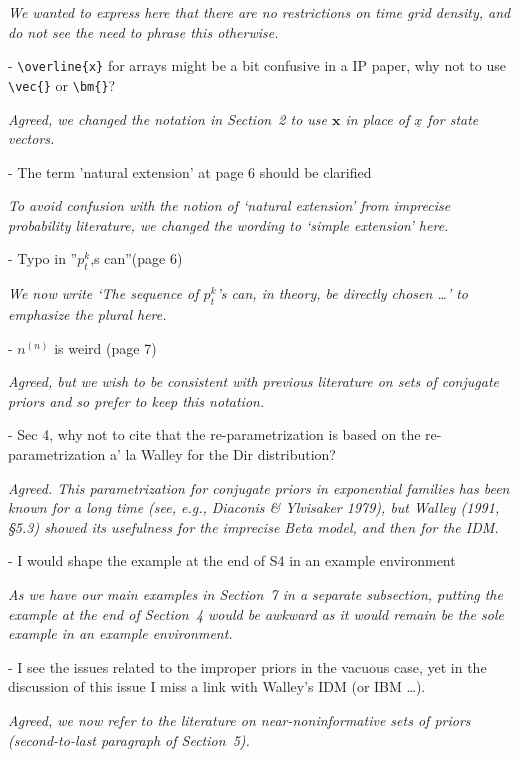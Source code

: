 \documentclass[12pt, a4paper]{elsarticle}
\newcommand{\bs}[1]{\boldsymbol{#1}}
\renewcommand{\vec}[1]{{\bs#1}}
\newcommand{\ptk}{p^k_t}
\begin{document}
\medskip
\emph{We wanted to express here that there are no restrictions on time grid density,
and do not see the need to phrase this otherwise.}
\medskip

- \verb+\overline{x}+ for arrays might be a bit confusive in a IP paper, why not to use \verb+\vec{}+ or \verb+\bm{}+?

\medskip
\emph{Agreed, we changed the notation in Section~2 to use $\vec{x}$ in place of $\underline{x}$ for state vectors.}
\medskip

- The term 'natural extension' at page 6 should be clarified

\medskip
\emph{To avoid confusion with the notion of `natural extension' from imprecise probability literature,
we changed the wording to `simple extension' here.}
\medskip

- Typo in ''$p_t^k$,s can''(page 6)

\medskip
\emph{We now write `The sequence of $\ptk$'s can, in theory, be directly chosen \ldots' to emphasize the plural here.}
\medskip

- $n^{(n)}$ is weird (page 7)

\medskip
\emph{Agreed, but we wish to be consistent with previous literature on sets of conjugate priors and so prefer to keep this notation.}
\medskip

- Sec 4, why not to cite that the re-parametrization is based on the re-parametrization a' la Walley for the Dir distribution?

\medskip
\emph{Agreed. This parametrization for conjugate priors in exponential families has been known for a long time
(see, e.g., Diaconis \& Ylvisaker 1979),
but Walley (1991, \S 5.3) showed its usefulness for the imprecise Beta model, and then for the IDM.
}
\medskip

- I would shape the example at the end of S4 in an example environment

\medskip
\emph{As we have our main examples in Section~7 in a separate subsection,
putting the example at the end of Section~4 would be awkward as
it would remain be the sole example in an example environment.}
\medskip

- I see the issues related to the improper priors in the vacuous case, yet in the discussion of this issue I miss a link with Walley's IDM (or IBM \ldots).

\medskip
\emph{Agreed, we now refer to the literature on near-noninformative sets of priors (second-to-last paragraph of Section~5).}
\medskip
\end{document}
